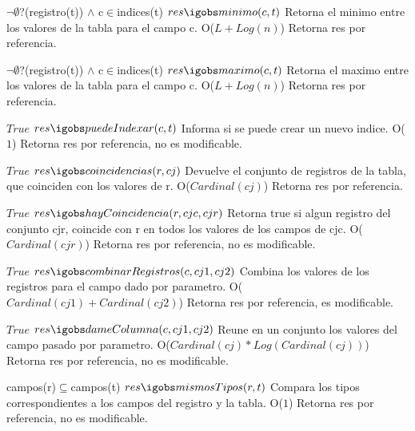  {$\neg\emptyset$?(registro(t)) $\land$ c$\in$indices(t)}
 {$res \igobs minimo(c,t)$}
 {Retorna el minimo entre los valores de la tabla para el campo c.}
 {O($L+Log(n)$)}
 {Retorna res por referencia.}
  
 {$\neg\emptyset$?(registro(t)) $\land$ c$\in$indices(t)}
 {$res \igobs maximo(c,t)$}
 {Retorna el maximo entre los valores de la tabla para el campo c.}
 {O($L+Log(n)$)}
 {Retorna res por referencia.} 

 {$True$}
 {$res \igobs puedeIndexar(c,t)$}
 {Informa si se puede crear un nuevo indice.}
 {O($1$)}
 {Retorna res por referencia, no es modificable.}

 {$True$}
 {$res \igobs coincidencias(r,cj)$}
 {Devuelve el conjunto de registros de la tabla, que coinciden con los valores de r.}
 {O($Cardinal(cj)$)}
 {Retorna res por referencia.} 

 {$True$}
 {$res \igobs hayCoincidencia(r,cjc,cjr)$}
 {Retorna true si algun registro del conjunto cjr, coincide con r en todos los valores de los campos de cjc.}
 {O($Cardinal(cjr)$)}
 {Retorna res por referencia, no es modificable.} 


 {$True$}
 {$res \igobs combinarRegistros(c,cj1,cj2)$}
 {Combina los valores de los registros para el campo dado por parametro.}
 {O($Cardinal(cj1)+Cardinal(cj2)$)}
 {Retorna res por referencia, es modificable.}

 {$True$}
 {$res \igobs dameColumna(c,cj1,cj2)$}
 {Reune en un conjunto los valores del campo pasado por parametro.}
 {O($Cardinal(cj)*Log(Cardinal(cj))$)}
 {Retorna res por referencia, no es modificable.} 

 {campos(r)$\subseteq$campos(t)}
 {$res \igobs mismosTipos(r,t)$}
 {Compara los tipos correspondientes a los campos del registro y la tabla.}
 {O($1$)}
 {Retorna res por referencia, no es modificable.} 

